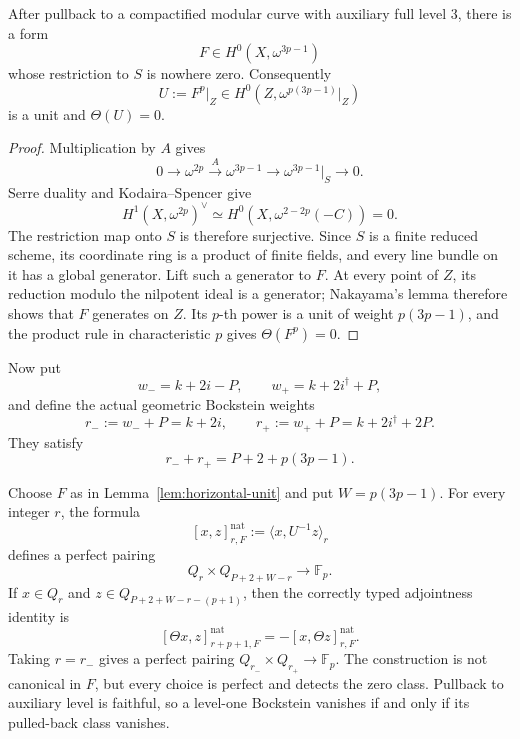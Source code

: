 \begin{lemma}
\label{lem:horizontal-unit}
After pullback to a compactified modular curve with auxiliary full level
$3$, there is a form
\[
 F\in H^0(X,\omega^{3p-1})
\]
whose restriction to $S$ is nowhere zero.  Consequently
\[
 U:=F^p\vert_Z\in H^0(Z,\omega^{p(3p-1)}\vert_Z)
\]
is a unit and $\Theta(U)=0$.
\end{lemma}

\begin{proof}
Multiplication by $A$ gives
\[
 0\longrightarrow\omega^{2p}
 \xrightarrow{\ A\ }\omega^{3p-1}
 \longrightarrow\omega^{3p-1}\vert_S\longrightarrow0.
\]
Serre duality and Kodaira--Spencer give
\[
 H^1(X,\omega^{2p})^\vee
 \simeq H^0(X,\omega^{2-2p}(-C))=0.
\]
The restriction map onto $S$ is therefore surjective.  Since $S$ is a
finite reduced scheme, its coordinate ring is a product of finite fields,
and every line bundle on it has a global generator.  Lift such a generator
to $F$.  At every point of $Z$, its reduction modulo the nilpotent ideal is
a generator; Nakayama's lemma therefore shows that $F$ generates on $Z$.
Its $p$-th power is a unit of weight $p(3p-1)$, and the product rule in
characteristic $p$ gives $\Theta(F^p)=0$.
\end{proof}

Now put
\[
 w_-=k+2i-P,
 \qquad
 w_+=k+2i^\dagger+P,
\]
and define the actual geometric Bockstein weights
\[
 r_-:=w_-+P=k+2i,
 \qquad
 r_+:=w_++P=k+2i^\dagger+2P.
\]
They satisfy
\begin{equation}\label{eq:natural-bockstein-weight-sum}
 r_-+r_+=P+2+p(3p-1).
\end{equation}

\begin{theorem}
\label{thm:natural-bockstein-pairing}
Choose $F$ as in Lemma~\ref{lem:horizontal-unit} and put
$W=p(3p-1)$.  For every integer $r$, the formula
\[
 [x,z]^{\mathrm{nat}}_{r,F}:=\langle x,U^{-1}z\rangle_r
\]
defines a perfect pairing
\[
 Q_r\times Q_{P+2+W-r}\longrightarrow\mathbb F_p.
\]
If $x\in Q_r$ and
$z\in Q_{P+2+W-r-(p+1)}$, then the correctly typed adjointness identity is
\[
 [\Theta x,z]^{\mathrm{nat}}_{r+p+1,F}
 =-[x,\Theta z]^{\mathrm{nat}}_{r,F}.
\]
Taking $r=r_-$ gives a perfect pairing
$Q_{r_-}\times Q_{r_+}\to\mathbb F_p$.  The construction is not canonical
in $F$, but every choice is perfect and detects the zero class.  Pullback
to auxiliary level is faithful, so a level-one Bockstein vanishes if and
only if its pulled-back class vanishes.
\end{theorem}

